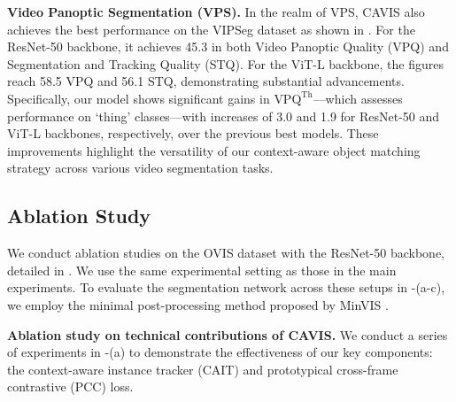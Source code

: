 \documentclass[10pt,twocolumn,letterpaper]{article}
\begin{document}
\textbf{Video Panoptic Segmentation (VPS).}
In the realm of VPS, CAVIS also achieves the best performance on the VIPSeg dataset as shown in . For the ResNet-50 backbone, it achieves 45.3 in both Video Panoptic Quality (VPQ) and Segmentation and Tracking Quality (STQ). For the ViT-L backbone, the figures reach 58.5 VPQ and 56.1 STQ, demonstrating substantial advancements. Specifically, our model shows significant gains in $\text{VPQ}^{\text{Th}}$—which assesses performance on `thing' classes—with increases of 3.0 and 1.9 for ResNet-50 and ViT-L backbones, respectively, over the previous best models. These improvements highlight the versatility of our context-aware object matching strategy across various video segmentation tasks.













\subsection{Ablation Study}
We conduct ablation studies on the OVIS dataset \citep{qi2022occluded} with the ResNet-50 \citep{he2016deep} backbone, detailed in .
We use the same experimental setting as those in the main experiments.
To evaluate the segmentation network across these setups in -(a-c), we employ the minimal post-processing method proposed by MinVIS \citep{huang2022minvis}.

\textbf{Ablation study on technical contributions of CAVIS.}
We conduct a series of experiments in -(a) to demonstrate the effectiveness of our key components: the context-aware instance tracker (CAIT) and prototypical cross-frame contrastive (PCC) loss.

\end{document}
